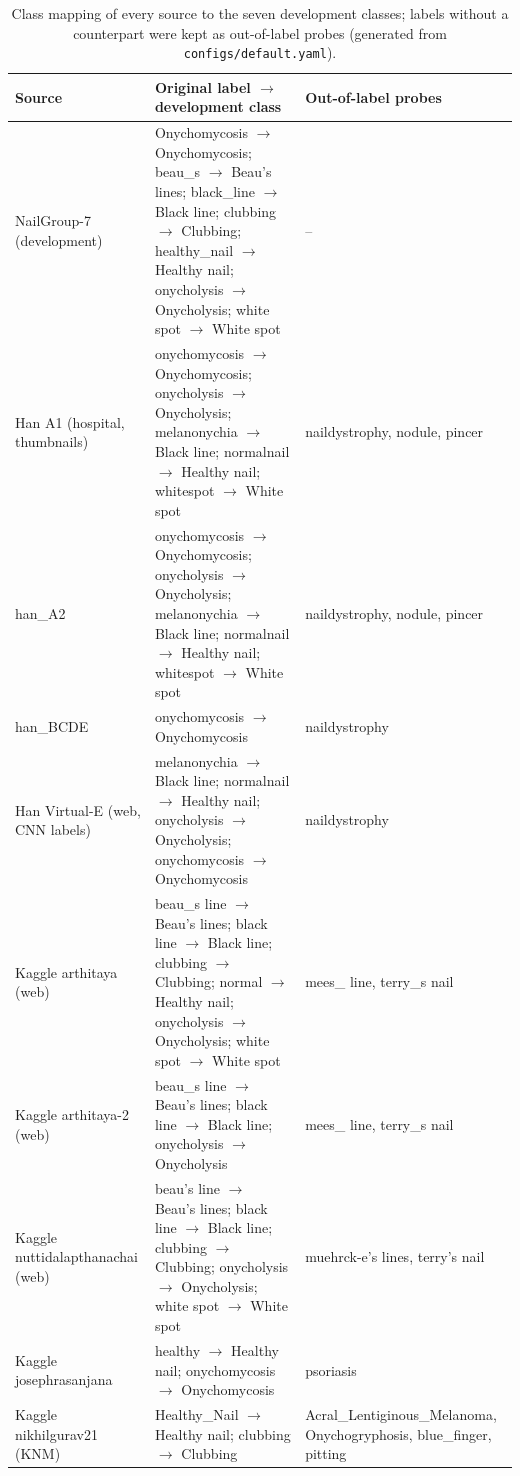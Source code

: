 \begin{table}[!htb]
\centering
\caption{Class mapping of every source to the seven development classes; labels without a counterpart were kept as out-of-label probes (generated from \texttt{configs/default.yaml}).}
\label{tab:classmapping}
\footnotesize
\begin{adjustbox}{max width=\linewidth}
\begin{tabular}{p{3.6cm}p{8.4cm}p{4.6cm}}
\hline
Source & Original label $\to$ development class & Out-of-label probes \\
\hline
NailGroup-7 (development) & Onychomycosis $\to$ Onychomycosis; beau\_s $\to$ Beau's lines; black\_line $\to$ Black line; clubbing $\to$ Clubbing; healthy\_nail $\to$ Healthy nail; onycholysis $\to$ Onycholysis; white spot $\to$ White spot & -- \\
Han A1 (hospital, thumbnails) & onychomycosis $\to$ Onychomycosis; onycholysis $\to$ Onycholysis; melanonychia $\to$ Black line; normalnail $\to$ Healthy nail; whitespot $\to$ White spot & naildystrophy, nodule, pincer \\
han\_A2 & onychomycosis $\to$ Onychomycosis; onycholysis $\to$ Onycholysis; melanonychia $\to$ Black line; normalnail $\to$ Healthy nail; whitespot $\to$ White spot & naildystrophy, nodule, pincer \\
han\_BCDE & onychomycosis $\to$ Onychomycosis & naildystrophy \\
Han Virtual-E (web, CNN labels) & melanonychia $\to$ Black line; normalnail $\to$ Healthy nail; onycholysis $\to$ Onycholysis; onychomycosis $\to$ Onychomycosis & naildystrophy \\
Kaggle arthitaya (web) & beau\_s line $\to$ Beau's lines; black line $\to$ Black line; clubbing $\to$ Clubbing; normal $\to$ Healthy nail; onycholysis $\to$ Onycholysis; white spot $\to$ White spot & mees\_ line, terry\_s nail \\
Kaggle arthitaya-2 (web) & beau\_s line $\to$ Beau's lines; black line $\to$ Black line; onycholysis $\to$ Onycholysis & mees\_ line, terry\_s nail \\
Kaggle nuttidalapthanachai (web) & beau's line $\to$ Beau's lines; black line $\to$ Black line; clubbing $\to$ Clubbing; onycholysis $\to$ Onycholysis; white spot $\to$ White spot & muehrck-e's lines, terry's nail \\
Kaggle josephrasanjana & healthy $\to$ Healthy nail; onychomycosis $\to$ Onychomycosis & psoriasis \\
Kaggle nikhilgurav21 (KNM) & Healthy\_Nail $\to$ Healthy nail; clubbing $\to$ Clubbing & Acral\_Lentiginous\_Melanoma, Onychogryphosis, blue\_finger, pitting \\

\end{tabular}
\end{adjustbox}
\end{table}
